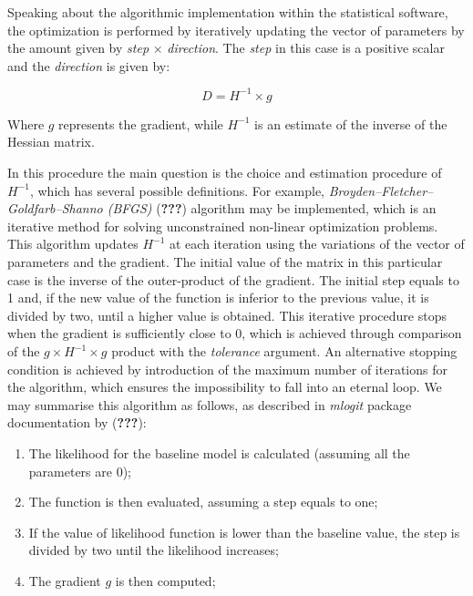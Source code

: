 \documentclass[11pt,]{article}
\providecommand{\tightlist}{%
  \setlength{\itemsep}{0pt}\setlength{\parskip}{0pt}}
\begin{document}
Speaking about the algorithmic implementation within the statistical
software, the optimization is performed by iteratively updating the
vector of parameters by the amount given by \emph{step} \(\times\)
\emph{direction}. The \emph{step} in this case is a positive scalar and
the \emph{direction} is given by:

\begin{equation}
D = H^{-1} \times g
\end{equation}

Where \(g\) represents the gradient, while \(H^{-1}\) is an estimate of
the inverse of the Hessian matrix.

In this procedure the main question is the choice and estimation
procedure of \(H^{-1}\), which has several possible definitions. For
example, \emph{Broyden--Fletcher--Goldfarb--Shanno (BFGS)}
({\textbf{???}}) algorithm may be implemented, which is an iterative
method for solving unconstrained non-linear optimization problems. This
algorithm updates \(H^{-1}\) at each iteration using the variations of
the vector of parameters and the gradient. The initial value of the
matrix in this particular case is the inverse of the outer-product of
the gradient. The initial step equals to 1 and, if the new value of the
function is inferior to the previous value, it is divided by two, until
a higher value is obtained. This iterative procedure stops when the
gradient is sufficiently close to 0, which is achieved through
comparison of the \(g \times H^{-1} \times g\) product with the
\emph{tolerance} argument. An alternative stopping condition is achieved
by introduction of the maximum number of iterations for the algorithm,
which ensures the impossibility to fall into an eternal loop. We may
summarise this algorithm as follows, as described in \emph{mlogit}
package documentation by ({\textbf{???}}):

\begin{enumerate}
\def\labelenumi{\arabic{enumi}.}
\tightlist
\item
  The likelihood for the baseline model is calculated (assuming all the
  parameters are 0);
\item
  The function is then evaluated, assuming a step equals to one;
\item
  If the value of likelihood function is lower than the baseline value,
  the step is divided by two until the likelihood increases;
\item
  The gradient \(g\) is then computed;
\end{enumerate}
\end{document}
